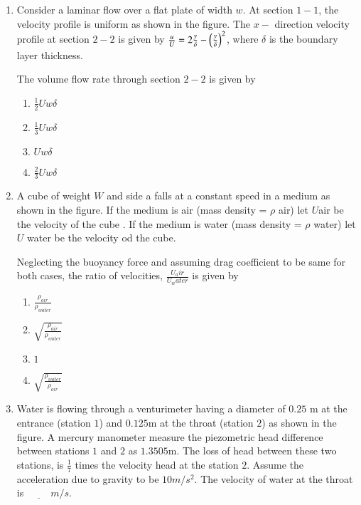 \documentclass[journal,12pt,onecolumn]{IEEEtran}
\theoremstyle{remark}
\begin{document}
\begin{enumerate}
\item Consider a laminar flow over a flat plate of width $w$. At section $1-1$, the velocity profile is uniform as shown in the figure. The $x-$ direction velocity profile at section $2-2$ is given by $\frac{u}{U}=2\frac{y}{\delta}-\left(\frac{y}{\delta}\right)^2$, where $\delta$ is the boundary layer thickness. 

The volume flow rate through section $2-2$ is given by 
\begin{enumerate}
    \item $\frac{1}{2}Uw\delta$
    \item $\frac{1}{3}Uw\delta$
    \item $Uw\delta$
    \item $\frac{2}{3}Uw\delta$
\end{enumerate}
\item A cube of weight $W$ and side a falls at a constant speed in a medium as shown in the figure. If the medium is air (mass density = $\rho$ air) let $U$air be the velocity of the cube . If the medium is water (mass density = $\rho$ water) let $U$ water be the velocity od the cube. 

Neglecting the buoyancy force and assuming drag coefficient to be same for both cases, the ratio of velocities, $\frac{U_air}{U_water}$ is given by 
\begin{enumerate}
    \item $\frac{\rho_{air}}{\rho_{water}}$
    \item $\sqrt{\frac{\rho_{air}}{\rho_{water}}}$
    \item $1$
    \item $\sqrt{\frac{\rho_{water}}{\rho_{air}}}$\\
\end{enumerate}
\item Water is flowing through a venturimeter having a diameter of $0.25$ m at the entrance (station $1$) and $0.125$m at the throat (station $2$) as shown in the figure. A mercury manometer measure the piezometric head difference between stations $1$ and $2$ as $1.3505$m. The loss of head between these two stations, is $\frac{1}{7}$ times the velocity head at the station $2$. Assume the acceleration due to gravity to be $10 m/s^2$. The velocity of water at the throat is $\underline{\hspace{1cm}} m/s.$\\



\end{enumerate}
\end{document}
